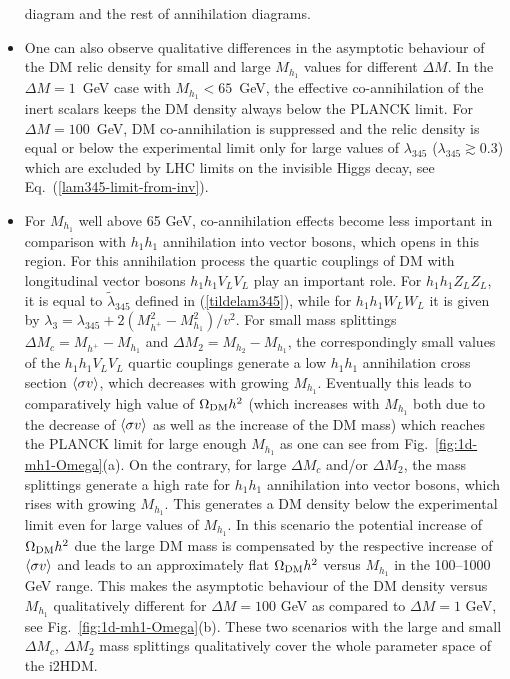 \documentclass[12pt,a4paper]{article}
\begin{document}
\begin{itemize}
diagram and the rest of annihilation diagrams.
\item
One can also observe qualitative differences in the asymptotic behaviour of the DM relic density for small
and large $M_{h_1}$ values for different $\Delta M$. In the $\Delta M=1$~GeV case with $M_{h_1} < 65$~GeV, the effective
co-annihilation of the inert scalars keeps the DM density always below the PLANCK limit. 
For $\Delta M=100 $~GeV, DM co-annihilation is suppressed and the relic density  is equal or below the experimental
limit only for large values of $\lambda_{345}$ ($\lambda_{345} \gtrsim 0.3$) which are excluded by LHC
limits on the invisible Higgs decay, see Eq.~(\ref{lam345-limit-from-inv}).
\item
For $M_{h_1}$ well above 65 GeV, co-annihilation effects become less important
in comparison with $h_1 h_1$ annihilation into vector bosons,
which opens in this region.
For this annihilation process the quartic couplings of DM with longitudinal vector bosons $h_1h_1 V_L V_L$ play an important role. 
For $h_1 h_1 Z_L Z_L$, it is equal to $\tilde\lambda_{345}$ defined in (\ref{tildelam345}), while for
$h_1 h_1 W_L W_L$ it is given by $\lambda_3 = \lambda_{345} + 2(M_{h^+}^2-M_{h_1}^2)/v^2$.
For small mass splittings $\Delta M_c = M_{h^+}-M_{h_1}$ and $\Delta M_2 = M_{h_2}-M_{h_1}$, 
the correspondingly small values of the $h_1h_1 V_L V_L$ quartic couplings 
generate a low $h_1 h_1$ annihilation cross section $\mathinner{\langle{\sigma v}\rangle}$, which decreases with growing $M_{h_1}$.
Eventually this leads to comparatively high value of $\Omega_{\rm DM} h^2$
(which increases with $M_{h_1}$ both
due to the decrease of $\mathinner{\langle{\sigma v}\rangle}$ as well as the increase of the DM mass)
which  reaches  the PLANCK limit for large enough $M_{h_1}$ 
as one can see from  Fig.~\ref{fig:1d-mh1-Omega}(a).
On the contrary, for large $\Delta M_c$ and/or $\Delta M_2$, the mass splittings generate
a high rate for $h_1 h_1$ annihilation into vector bosons, which rises with growing $M_{h_1}$. 
This generates a DM density below the experimental limit even for large values of $M_{h_1}$.
In this scenario the potential increase of  $\Omega_{\rm DM} h^2$ due the large DM mass
is compensated by the respective increase of  $\mathinner{\langle{\sigma v}\rangle}$
and leads to an approximately flat $\Omega_{\rm DM} h^2$ versus $M_{h_1}$
in the 100--1000 GeV  range.
This makes the asymptotic behaviour of the DM density versus $M_{h_1}$ qualitatively different for $\Delta M = 100$ GeV 
as compared to $\Delta M = 1$ GeV, see Fig.~\ref{fig:1d-mh1-Omega}(b).
These two scenarios with the large and small $\Delta M_c$, $\Delta M_2$ mass splittings 
qualitatively cover the whole parameter space of the i2HDM.
\end{itemize} 
\end{document}
